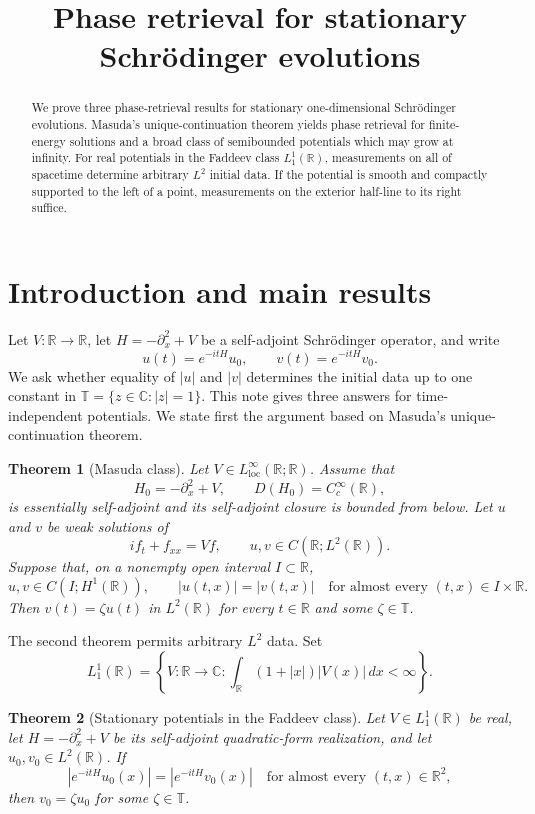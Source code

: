 \documentclass[11pt]{amsart}
\title{Phase retrieval for stationary Schr\"odinger evolutions}
\author{}
\date{}
\newtheorem{mainresult}{Theorem}
\numberwithin{equation}{section}
\theoremstyle{remark}
\newcommand{\R}{\mathbb R}
\newcommand{\C}{\mathbb C}
\newcommand{\T}{\mathbb T}
\begin{document}
\raggedbottom

\begin{abstract}
We prove three phase-retrieval results for stationary one-dimensional
Schr\"odinger evolutions.  Masuda's unique-continuation theorem yields phase
retrieval for finite-energy solutions and a broad class of semibounded
potentials which may grow at infinity.  For real potentials in the Faddeev
class $L^1_1(\mathbb R)$, measurements on all of spacetime determine arbitrary
$L^2$ initial data.  If the potential is smooth and compactly supported to the
left of a point, measurements on the exterior half-line to its right suffice.
\end{abstract}

\maketitle

\tableofcontents

\section{Introduction and main results}

Let $V:\R\to\R$, let $H=-\partial_x^2+V$ be a self-adjoint
Schr\"odinger operator, and write
\[
 u(t)=e^{-itH}u_0,\qquad v(t)=e^{-itH}v_0.
\]
We ask whether equality of $|u|$ and $|v|$ determines the initial data up to
one constant in $\T=\{z\in\C:|z|=1\}$.  This note gives three answers for
time-independent potentials.  We state first the argument based on Masuda's
unique-continuation theorem.

\begin{mainresult}[Masuda class]
\label{thm:phase-retrieval}
Let $V\in L^\infty_{\mathrm{loc}}(\R;\R)$.  Assume that
\[
 H_0=-\partial_x^2+V,\qquad D(H_0)=C_c^\infty(\R),
\]
is essentially self-adjoint and its self-adjoint closure is bounded from
below.  Let $u$ and $v$ be weak solutions of
\[
 if_t+f_{xx}=Vf,
 \qquad u,v\in C(\R;L^2(\R)).
\]
Suppose that, on a nonempty open interval $I\subset\R$,
\[
 u,v\in C(I;H^1(\R)),\qquad
 |u(t,x)|=|v(t,x)|
 \quad\text{for almost every }(t,x)\in I\times\R.
\]
Then $v(t)=\zeta u(t)$ in $L^2(\R)$ for every $t\in\R$ and some
$\zeta\in\T$.
\end{mainresult}

The second theorem permits arbitrary $L^2$ data.  Set
\[
 L^1_1(\R)=\left\{V:\R\to\C:
 \int_\R(1+|x|)|V(x)|\,dx<\infty\right\}.
\]

\begin{mainresult}[Stationary potentials in the Faddeev class]
\label{thm:main}
Let $V\in L^1_1(\R)$ be real, let $H=-\partial_x^2+V$ be its
self-adjoint quadratic-form realization, and let $u_0,v_0\in L^2(\R)$.  If
\[
 |e^{-itH}u_0(x)|=|e^{-itH}v_0(x)|
 \quad\text{for almost every }(t,x)\in\R^2,
\]
then $v_0=\zeta u_0$ for some $\zeta\in\T$.
\end{mainresult}
\end{document}
